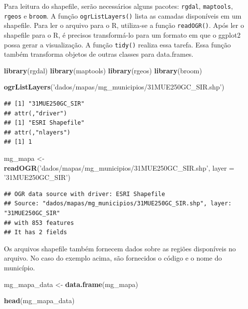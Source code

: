 \documentclass[]{book}
\newenvironment{Shaded}{\begin{snugshade}}{\end{snugshade}}
\newcommand{\KeywordTok}[1]{\textcolor[rgb]{0.13,0.29,0.53}{\textbf{#1}}}
\newcommand{\DataTypeTok}[1]{\textcolor[rgb]{0.13,0.29,0.53}{#1}}
\newcommand{\StringTok}[1]{\textcolor[rgb]{0.31,0.60,0.02}{#1}}
\newcommand{\NormalTok}[1]{#1}
\begin{document}
Para leitura do shapefile, serão necessários alguns pacotes:
\texttt{rgdal}, \texttt{maptools}, \texttt{rgeos} e \texttt{broom}. A
função \texttt{ogrListLayers()} lista as camadas disponíveis em um
shapefile. Para ler o arquivo para o R, utiliza-se a função
\texttt{readOGR()}. Após ler o shapefile para o R, é precisos
transformá-lo para um formato em que o ggplot2 possa gerar a
visualização. A função \texttt{tidy()} realiza essa tarefa. Essa função
também transforma objetos de outras classes para data.frames.

\begin{Shaded}
\begin{Highlighting}[]
\KeywordTok{library}\NormalTok{(rgdal)}
\KeywordTok{library}\NormalTok{(maptools)}
\KeywordTok{library}\NormalTok{(rgeos)}
\KeywordTok{library}\NormalTok{(broom)}

\KeywordTok{ogrListLayers}\NormalTok{(}\StringTok{'dados/mapas/mg_municipios/31MUE250GC_SIR.shp'}\NormalTok{)}
\end{Highlighting}
\end{Shaded}

\begin{verbatim}
## [1] "31MUE250GC_SIR"
## attr(,"driver")
## [1] "ESRI Shapefile"
## attr(,"nlayers")
## [1] 1
\end{verbatim}

\begin{Shaded}
\begin{Highlighting}[]
\NormalTok{mg_mapa <-}\StringTok{ }\KeywordTok{readOGR}\NormalTok{(}\StringTok{'dados/mapas/mg_municipios/31MUE250GC_SIR.shp'}\NormalTok{,}
                   \DataTypeTok{layer =} \StringTok{'31MUE250GC_SIR'}\NormalTok{)}
\end{Highlighting}
\end{Shaded}

\begin{verbatim}
## OGR data source with driver: ESRI Shapefile 
## Source: "dados/mapas/mg_municipios/31MUE250GC_SIR.shp", layer: "31MUE250GC_SIR"
## with 853 features
## It has 2 fields
\end{verbatim}

Os arquivos shapefile também fornecem dados sobre as regiões disponíveis
no arquivo. No caso do exemplo acima, são fornecidos o código e o nome
do município.

\begin{Shaded}
\begin{Highlighting}[]
\NormalTok{mg_mapa_data <-}\StringTok{ }\KeywordTok{data.frame}\NormalTok{(mg_mapa)}

\KeywordTok{head}\NormalTok{(mg_mapa_data)}
\end{Highlighting}
\end{Shaded}
\end{document}
